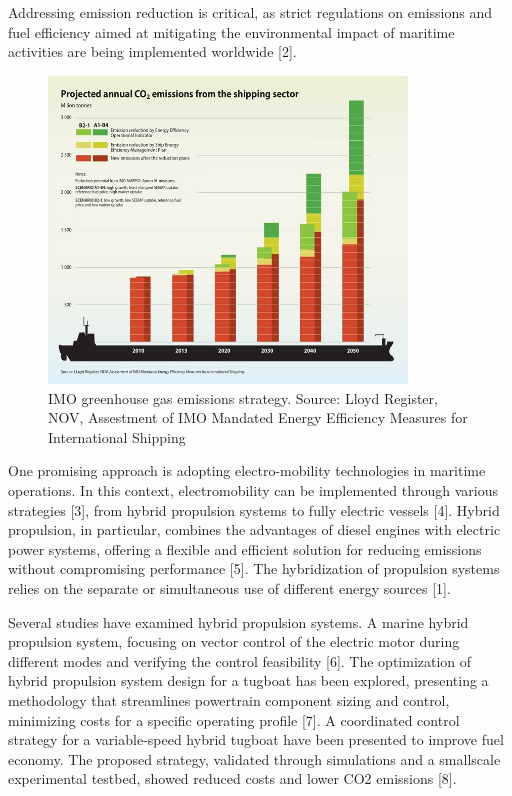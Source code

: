 Addressing emission reduction is critical, as strict regulations on emissions and fuel efficiency aimed at mitigating the environmental impact of maritime activities are being implemented worldwide [2].

\begin{figure}[!h]
    \centering
    \includegraphics[width=0.85\textwidth]{images/chapter01/CO2_maritime_transport.jpg}
    \caption{IMO greenhouse gas emissions strategy. Source: Lloyd Register, NOV, Assestment of IMO Mandated Energy Efficiency Measures for International Shipping}
    \label{circuito_2}
\end{figure}

One promising approach is adopting electro-mobility technologies in maritime operations. In this context, electromobility can be implemented through various strategies [3], from hybrid propulsion systems to fully electric vessels [4]. Hybrid propulsion, in particular, combines the advantages of diesel engines with electric power systems, offering a flexible and efficient solution for reducing emissions without compromising performance [5]. The hybridization of propulsion systems relies on the separate or simultaneous use of different energy sources [1].

Several studies have examined hybrid propulsion systems. A marine hybrid propulsion system, focusing on vector control of the electric motor during different modes and verifying the control feasibility [6]. The optimization of hybrid propulsion system design for a tugboat has been explored, presenting a methodology that streamlines powertrain component sizing and control, minimizing costs for a specific operating profile [7]. A coordinated control strategy for a variable-speed hybrid tugboat have been presented to improve fuel economy. The proposed strategy, validated through simulations and a smallscale experimental testbed, showed reduced costs and lower CO2 emissions [8].

